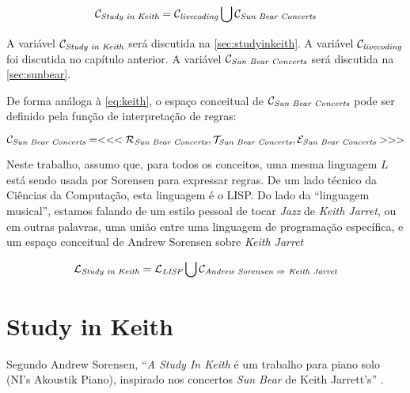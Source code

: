 \documentclass[
	12pt,				%
	openright,			%
	twoside,			%
	a4paper,			%
	english,			%
	french,				%
	spanish,			%
        italian,                        %
	brazil				%
	]{abntex2}
\begin{document}
\begin{equation}
\mathcal{C}_\emph{Study in Keith} = \mathcal{C}_\emph{livecoding} \bigcup \mathcal{C}_\emph{Sun Bear Concerts}
\end{equation}\label{eq:espaco_pesquisa}

A variável $\mathcal{C}_\emph{Study in Keith}$ será discutida na \autoref{sec:studyinkeith}. A variável $\mathcal{C}_\emph{livecoding}$ foi discutida no capítulo anterior. A variável $\mathcal{C}_\emph{Sun Bear Concerts}$ será discutida na \autoref{sec:sunbear}.

De forma análoga à \autoref{eq:keith}, o espaço conceitual de $\mathcal{C}_\emph{Sun Bear Concerts}$ pode ser definido pela função de interpretação de regras:

\begin{equation}
\mathcal{C}_\emph{Sun Bear Concerts} = <<<\mathcal{R}_\emph{Sun Bear Concerts}, \mathcal{T}_\emph{Sun Bear Concerts},  \mathcal{E}_\emph{Sun Bear Concerts} >>> 
\end{equation}\label{eq:sunbear}

Neste trabalho, assumo que, para todos os conceitos, uma mesma linguagem $L$ está sendo usada por Sorensen para expressar regras. De um lado técnico da Ciências da Computação, esta linguagem é o LISP. Do lado da ``linguagem musical'', estamos falando de um estilo pessoal de tocar \emph{Jazz} de \emph{Keith Jarret}, ou em outras palavras, uma união entre uma linguagem de programação específica, e um espaço conceitual de Andrew Sorensen sobre \emph{Keith Jarret}

\begin{equation}
\mathcal{L}_\emph{Study in Keith} = \mathcal{L}_\emph{LISP} \bigcup \mathcal{C}_\emph{Andrew Sorensen $\Rightarrow$ Keith Jarret}
\end{equation}\label{eq:sunbear}

\section{Study in Keith}\label{sec:studyinkeith}

Segundo Andrew Sorensen, ``\emph{A Study In Keith} é um trabalho para piano solo (NI's Akoustik Piano), inspirado nos concertos \emph{Sun Bear} de Keith Jarrett's'' \cite{sorensen_keith_2009}.
\end{document}
